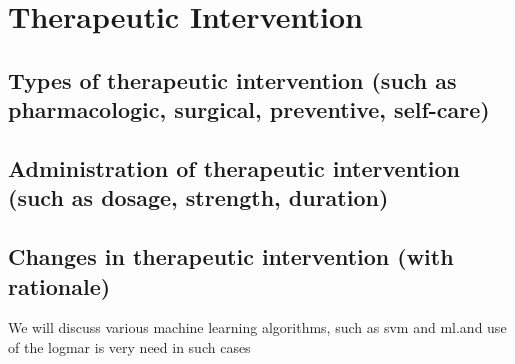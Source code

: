 \section{Therapeutic Intervention}
\subsection{Types of therapeutic intervention (such as pharmacologic, surgical, preventive, self-care)}
\subsection{Administration of therapeutic intervention (such as dosage, strength, duration)}
\subsection{Changes in therapeutic intervention (with rationale)}


We will discuss various machine learning algorithms, such as \gls{svm} and \acrshort{ml}.and use of the \acrshort{logmar} is very need in such cases
